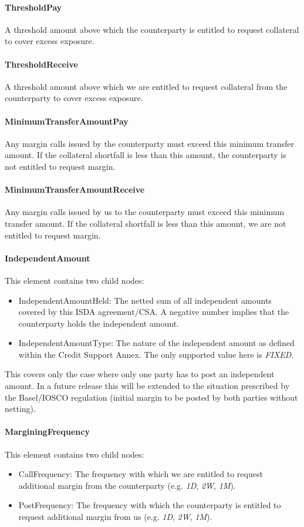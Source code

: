 \paragraph{ThresholdPay} A threshold amount above which the
counterparty is entitled to request collateral to cover excess
exposure.

\paragraph{ThresholdReceive} A threshold amount above which we are
entitled to request collateral from the counterparty to cover excess
exposure.

\paragraph{MinimumTransferAmountPay} Any margin calls issued by the
counterparty must exceed this minimum transfer amount. If the
collateral shortfall is less than this amount, the counterparty is not
entitled to request margin.

\paragraph{MinimumTransferAmountReceive} Any margin calls issued by us
to the counterparty must exceed this minimum transfer amount. If the
collateral shortfall is less than this amount, we are  not
entitled to request margin.

\paragraph{IndependentAmount} This element contains two child nodes:
\begin{itemize}
\item IndependentAmountHeld: The netted sum of all independent amounts
  covered by this ISDA agreement/CSA. A negative number implies that
  the counterparty holds the independent amount.
\item IndependentAmountType: The nature of the independent amount as
  defined within the Credit Support Annex. The only supported value
  here is \emph{FIXED}. 
\end{itemize}
This covers only the case where only one party has to post an
independent amount. In a future release this will be extended to the
situation prescribed by the Basel/IOSCO regulation (initial margin to
be posted by both parties without netting).

\paragraph{MarginingFrequency} This element contains two child nodes:
\begin{itemize}
\item CallFrequency: The frequency with which we are entitled to
  request additional margin from the counterparty (e.g. \emph{1D},
  \emph{2W}, \emph{1M}).
\item PostFrequency: The frequency with which the counterparty is entitled to
  request additional margin from us (e.g. \emph{1D},
  \emph{2W}, \emph{1M}).
\end{itemize}


